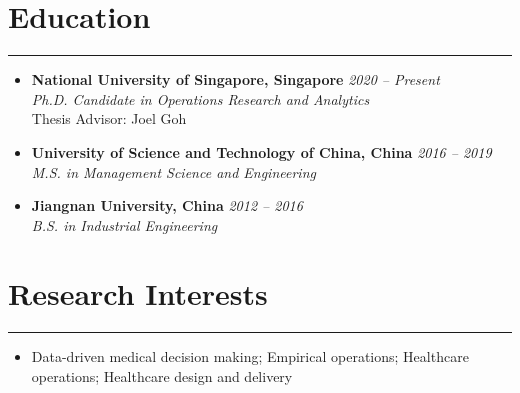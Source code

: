 \documentclass[12pt, a4paper]{article}
\begin{document}
{\small

\section*{Education}
\vspace*{0.4em}
\hrule height 0.4pt
\begin{itemize}[leftmargin=0pt, itemsep=6pt, parsep=0.2pt, topsep=1pt]

	\item[]
	\textbf{National University of Singapore, Singapore} \hfill \textit{2020 -- Present} \\
	\textit{Ph.D. Candidate in Operations Research and Analytics} \\
	Thesis Advisor: Joel Goh

	\item[]
	\textbf{University of Science and Technology of China, China} \hfill \textit{2016 -- 2019} \\
	\textit{M.S. in Management Science and Engineering}

	\item[]
	\textbf{Jiangnan University, China} \hfill \textit{2012 -- 2016} \\
	\textit{B.S. in Industrial Engineering}

\end{itemize}




\section*{Research Interests}
\vspace*{0.4em}
\hrule height 0.5pt
\begin{itemize}[leftmargin=2pt, itemsep=6pt, parsep=0.2pt, topsep=1pt]

	\item[] Data-driven medical decision making; Empirical operations; Healthcare operations;  Healthcare design and delivery
	
\end{itemize}

}
\end{document}
